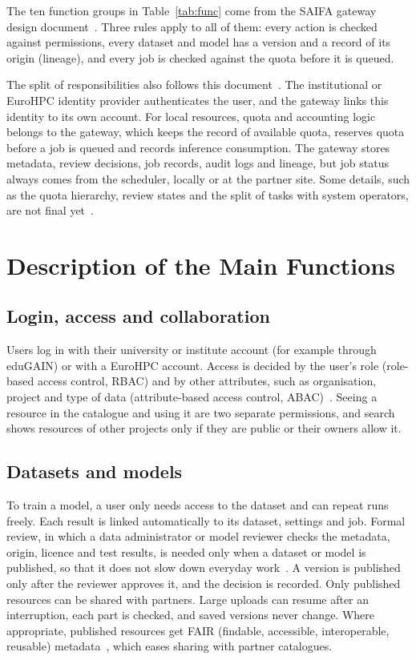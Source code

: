 \documentclass[conference,a4paper]{IEEEtran}
\DeclareRobustCommand{\chg}[1]{#1}
\DeclareRobustCommand{\dop}[1]{#1}
\DeclareRobustCommand{\roz}[1]{#1}
\DeclareRobustCommand{\nov}[1]{#1}
\DeclareRobustCommand{\tri}[1]{#1}
\begin{document}
The ten function groups in Table~\ref{tab:func} come from the SAIFA \tri{gateway} design \tri{document~\cite{saifa_d31}}. \roz{Three rules apply to all of them: every action is checked against permissions, every dataset and model has a version and a record of its origin (lineage), and every job is checked against the quota before it is queued.}

\roz{The split of responsibilities} \tri{also follows this document}~\cite{saifa_d31}. \chg{The institutional or EuroHPC identity provider authenticates the user, and the gateway links this identity to its own account.} \roz{For local resources,} \chg{quota and accounting logic belongs to the gateway, which} \dop{keeps the record of available quota,} \chg{reserves} \roz{quota} \chg{before a job is queued and records inference consumption.} \roz{The gateway stores metadata, review decisions, job records, audit logs and lineage, but job status always comes from the scheduler, locally or at the partner site. Some details, such as the quota hierarchy, review states and the split of tasks with system operators, are not final yet}~\cite{saifa_d31}.

\section{Description of the Main Functions}
\label{sec:functions}

\subsection{Login, access and collaboration}
Users log in with their university or institute account (for example through eduGAIN) or with a EuroHPC account. Access is decided by the user's role \roz{(role-based access control, RBAC)} and by other attributes, such as organisation, project and type of data \roz{(attribute-based access control, ABAC)}~\cite{nist_abac}. Seeing a resource in the catalogue and using it are two separate permissions, \roz{and search shows resources of other projects only if they are public or their owners allow it}.

\subsection{Datasets and models}
\roz{To train a model, a user only needs access to the dataset and can repeat runs freely. Each result is linked automatically to its dataset, settings and job. Formal review, in which a data administrator or model reviewer checks the metadata, origin, licence and test results, is needed only when a dataset or model is published}\nov{, so that it does not slow down everyday work}~\cite{saifa_d31}. \chg{A version is published only after} \roz{the reviewer} \chg{approves it, and the decision is recorded.} \roz{Only published resources can be shared with partners.} \nov{\tri{Large uploads can resume after an interruption, each part is checked, and saved versions never change.} Where appropriate, published resources get} FAIR \tri{(findable, accessible, interoperable, reusable)} metadata~\cite{wilkinson2016fair}, which \roz{eases sharing with} partner catalogues.
\end{document}
